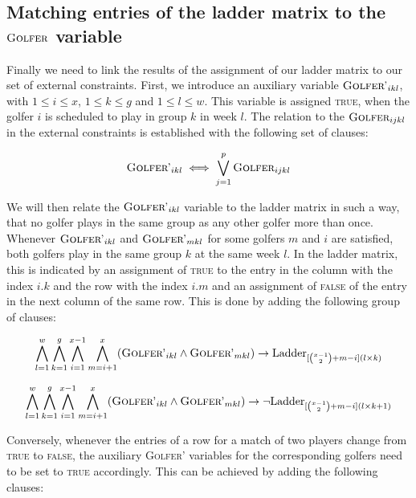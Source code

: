 \documentclass[a4paper]{scrartcl}
\begin{document}
\subsection{Matching entries of the ladder matrix to the $\textsc{Golfer}$ variable}

Finally we need to link the results of the assignment of our ladder matrix to our set of external constraints. First, we introduce an auxiliary variable $\textsc{Golfer'}_{ikl}$, with $1 \leq i \leq x$, $1 \leq k \leq g$ and $1 \leq l \leq w$. This variable is assigned \textsc{true}, when the golfer $i$ is scheduled to play in group $k$ in week $l$. The relation to the $\textsc{Golfer}_{ijkl}$ in the external constraints is established with the following set of clauses:

\begin{equation}
    \textsc{Golfer'}_{ikl} \iff \bigvee \limits_{j=1}^p \textsc{Golfer}_{ijkl}
\end{equation}

We will then relate the $\textsc{Golfer'}_{ikl}$ variable to the ladder matrix in such a way, that no golfer plays in the same group as any other golfer more than once. Whenever $\textsc{Golfer'}_{ikl}$ and $\textsc{Golfer'}_{mkl}$ for some golfers $m$ and $i$ are satisfied, both golfers play in the same group $k$ at the same week $l$. In the ladder matrix, this is indicated by an assignment of \textsc{true} to the entry in the column with the index $i.k$ and the row with the index $i.m$ and an assignment of \textsc{false} of the entry in the next column of the same row. This is done by adding the following group of clauses:

\begin{equation}
\centering
    \bigwedge \limits_{l=1}^{w}
    \bigwedge \limits_{k=1}^{g}
    \bigwedge \limits_{i=1}^{x-1}
    \bigwedge \limits_{m=i+1}^{x}
    (\textsc{Golfer'}_{ikl} \wedge \textsc{Golfer'}_{mkl}) \to \text{Ladder}_{[{x-1 \choose 2}+m-i](l \times k)}
\end{equation}

\begin{equation}
\centering
    \bigwedge \limits_{l=1}^{w}
    \bigwedge \limits_{k=1}^{g}
    \bigwedge \limits_{i=1}^{x-1}
    \bigwedge \limits_{m=i+1}^{x}
    (\textsc{Golfer'}_{ikl} \wedge \textsc{Golfer'}_{mkl}) \to \neg \text{Ladder}_{[{x-1 \choose 2}+m-i](l \times k + 1)}
\end{equation}

Conversely, whenever the entries of a row for a match of two players change from \textsc{true} to \textsc{false}, the auxiliary \textsc{Golfer'} variables for the corresponding golfers need to be set to \textsc{true} accordingly. This can be achieved by adding the following clauses:
\end{document}
